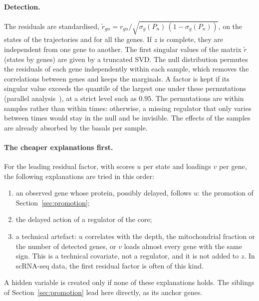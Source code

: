 \documentclass[a4paper, 11pt]{article}
\theoremstyle{plain}
\theoremstyle{remark}
\begin{document}
\paragraph{Detection.} The residuals are standardised, $\tilde r_{gn} = r_{gn} / \sqrt{\sigma_g(P_n)\,(1 - \sigma_g(P_n))}$, on the states of the trajectories and for all the genes. If $z$ is complete, they are independent from one gene to another. The first singular values of the matrix $\tilde r$ (states by genes) are given by a truncated SVD. The null distribution permutes the residuals of each gene independently within each sample, which removes the correlations between genes and keeps the marginals. A factor is kept if its singular value exceeds the quantile of the largest one under these permutations (parallel analysis~\cite{horn1965rationale}), at a strict level such as $0.95$. The permutations are within samples rather than within times: otherwise, a missing regulator that only varies between times would stay in the null and be invisible. The effects of the samples are already absorbed by the basals per sample.

\paragraph{The cheaper explanations first.} For the leading residual factor, with scores $u$ per state and loadings $v$ per gene, the following explanations are tried in this order:
\begin{enumerate}[nosep]
\item an observed gene whose protein, possibly delayed, follows $u$: the promotion of Section~\ref{sec:promotion};
\item the delayed action of a regulator of the core;
\item a technical artefact: $u$ correlates with the depth, the mitochondrial fraction or the number of detected genes, or $v$ loads almost every gene with the same sign. This is a technical covariate, not a regulator, and it is not added to $z$. In scRNA-seq data, the first residual factor is often of this kind.
\end{enumerate}
A hidden variable is created only if none of these explanations holds. The siblings of Section~\ref{sec:promotion} lead here directly, as its anchor genes.
\end{document}
